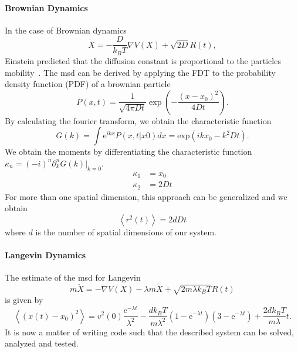 \paragraph{Brownian Dynamics}
In the case of Brownian dynamics~\cite{Brown1828}
\begin{equation}
    \dot{X} = -\frac{D}{k_B T} \nabla V(X) + \sqrt{2D}R(t),
\end{equation}
Einstein predicted that the diffusion constant is proportional to the particles
mobility~\cite{Einstein1905}.
The \ac{msd} can be derived by applying the FDT to the probability density function (PDF) of a
brownian particle
\begin{equation}
    P(x,t) = \frac{1}{\sqrt{4\pi D t}}\exp\left(-\frac{(x-x_0)^2}{4Dt}\right).
\end{equation}
By calculating the fourier transform, we obtain the characteristic function
\begin{equation}
    G(k) = \int \text{e}^{ikx} P(x,t|x0)dx = \text{exp}(ikx_0 - k^2Dt).
\end{equation}
We obtain the moments by differentiating the characteristic function
$\kappa_n = (-i)^n\partial_k^n G(k)|_{k=0}$.
\begin{align}
    \kappa_1 &= x_0\\
    \kappa_2 &= 2Dt
\end{align}
For more than one spatial dimension, this approach can be generalized and we obtain
\begin{equation}
    \left<r^2(t)\right> = 2d D t
\end{equation}
where $d$ is the number of spatial dimensions of our system.

\paragraph{Langevin Dynamics}
The estimate of the \ac{msd} for Langevin~\cite{Lemons1997}
\begin{equation}
    m \ddot{X} = - \nabla V(X) - \lambda m \dot{X} + \sqrt{2m\lambda k_B T}R(t)
\end{equation}
is given by~\cite{VANKAMPEN2007}
\begin{equation}
    \left<(x(t)-x_0)^2\right> =
        v^2(0) \frac{\text{e}^{-\lambda t}}{\lambda^2}
        - \frac{d k_B T}{m\lambda^2}
            \left(1-\text{e}^{-\lambda t}\right)
            \left(3 - \text{e}^{-\lambda t}\right)
        + \frac{2 d k_B T}{m\lambda}t.
\end{equation}
It is now a matter of writing code such that the described system can be solved, analyzed and
tested.

